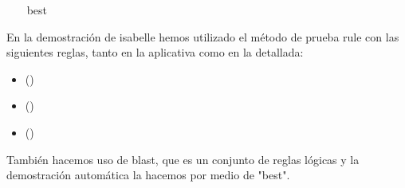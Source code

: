 \begin{isabellebody}
%
\isadelimproof
\ \ %
\endisadelimproof
%
\isatagproof
{}\isamarkupfalse%
\ best%
\endisatagproof
{\isafoldproof}%
%
\isadelimproof
%
\endisadelimproof
%
\begin{isamarkuptext}%
En la demostración de isabelle hemos utilizado el método de prueba
rule con las siguientes reglas, tanto en la aplicativa como en la
 detallada:
 \begin{itemize}
  \item[]  \hfill ()
  \end{itemize}
 \begin{itemize}
  \item[]  \hfill ()
  \end{itemize}
 \begin{itemize}
  \item[]  \hfill ()
  \end{itemize}
También hacemos uso de blast, que es un conjunto de reglas lógicas y 
 la demostración automática la hacemos por medio de "best".%
\end{isamarkuptext}\isamarkuptrue%
%
\isadelimtheory
%
\endisadelimtheory
%
\isatagtheory
%
\endisatagtheory
{\isafoldtheory}%
%
\isadelimtheory
%
\endisadelimtheory
%
\end{isabellebody}%
\endinput
